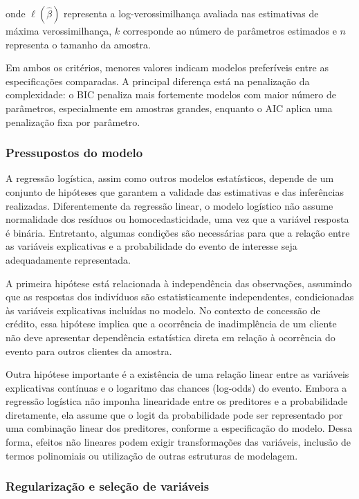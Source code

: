 \documentclass[
  brazilian,
  12pt,
  letterpaper,
  DIV=11,
  numbers=noendperiod]{scrartcl}
\begin{document}
onde \(\ell(\hat{\beta})\) representa a log-verossimilhança avaliada nas
estimativas de máxima verossimilhança, \(k\) corresponde ao número de
parâmetros estimados e \(n\) representa o tamanho da amostra.

Em ambos os critérios, menores valores indicam modelos preferíveis entre
as especificações comparadas. A principal diferença está na penalização
da complexidade: o BIC penaliza mais fortemente modelos com maior número
de parâmetros, especialmente em amostras grandes, enquanto o AIC aplica
uma penalização fixa por parâmetro.

\subsubsection{Pressupostos do modelo}\label{pressupostos-do-modelo}

A regressão logística, assim como outros modelos estatísticos, depende
de um conjunto de hipóteses que garantem a validade das estimativas e
das inferências realizadas. Diferentemente da regressão linear, o modelo
logístico não assume normalidade dos resíduos ou homocedasticidade, uma
vez que a variável resposta é binária. Entretanto, algumas condições são
necessárias para que a relação entre as variáveis explicativas e a
probabilidade do evento de interesse seja adequadamente representada.

A primeira hipótese está relacionada à independência das observações,
assumindo que as respostas dos indivíduos são estatisticamente
independentes, condicionadas às variáveis explicativas incluídas no
modelo. No contexto de concessão de crédito, essa hipótese implica que a
ocorrência de inadimplência de um cliente não deve apresentar
dependência estatística direta em relação à ocorrência do evento para
outros clientes da amostra.

Outra hipótese importante é a existência de uma relação linear entre as
variáveis explicativas contínuas e o logaritmo das chances (log-odds) do
evento. Embora a regressão logística não imponha linearidade entre os
preditores e a probabilidade diretamente, ela assume que o logit da
probabilidade pode ser representado por uma combinação linear dos
preditores, conforme a especificação do modelo. Dessa forma, efeitos não
lineares podem exigir transformações das variáveis, inclusão de termos
polinomiais ou utilização de outras estruturas de modelagem.

\subsubsection{Regularização e seleção de
variáveis}\label{regularizauxe7uxe3o-e-seleuxe7uxe3o-de-variuxe1veis}
\end{document}
